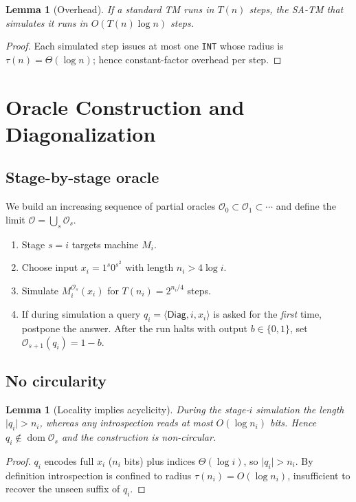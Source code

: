 \documentclass[12pt]{article}
\newcommand{\OO}{\mathcal{O}}
\newcommand{\Diag}{\mathsf{Diag}}
\DeclareMathOperator{\dom}{dom}            %
\theoremstyle{definition}
\theoremstyle{plain}
\newtheorem{lemma}[definition]{Lemma}
\theoremstyle{remark}
\begin{document}
\begin{lemma}[Overhead]\label{lem:overhead}
If a standard TM runs in \(T(n)\) steps, the SA-TM that simulates it
runs in \(O(T(n)\log n)\) steps.
\end{lemma}
\begin{proof}
Each simulated step issues at most one \texttt{INT}
whose radius is \(\tau(n)=\Theta(\log n)\);
hence constant-factor overhead per step.
\end{proof}

\section{Oracle Construction and Diagonalization}\label{sec:oracle}

\subsection{Stage-by-stage oracle}

We build an increasing sequence of partial oracles
\(\OO_0\subset\OO_1\subset\cdots\) and define the limit
\(\OO=\bigcup_s\OO_s\).

\begin{enumerate}
  \item Stage \(s=i\) targets machine \(M_i\).
  \item Choose input
        \(x_i = 1^s0^{s^2}\) with length \(n_i>4\log i\).
  \item Simulate \(M_i^{\OO_s}(x_i)\) for
        \(T(n_i)=2^{n_i/4}\) steps.
  \item If during simulation a query
        \(q_i=\langle\Diag,i,x_i\rangle\) is asked
        for the \emph{first} time, postpone the answer.
        After the run halts with output \(b\in\{0,1\}\),
        set \(\OO_{s+1}(q_i)=1-b\).
\end{enumerate}

\subsection{No circularity}

\begin{lemma}[Locality implies acyclicity]\label{lem:nocirc}
During the stage-\(i\) simulation the length \(\lvert q_i\rvert>n_i\),
whereas any introspection reads at most \(O(\log n_i)\) bits.
Hence \(q_i\notin\dom\OO_s\) and the construction is non-circular.
\end{lemma}
\begin{proof}
\(q_i\) encodes full \(x_i\) (\(n_i\) bits) plus indices \(\Theta(\log i)\),
so \(\lvert q_i\rvert>n_i\).
By definition introspection is confined to radius \(\tau(n_i)=O(\log n_i)\),
insufficient to recover the unseen suffix of \(q_i\).
\end{proof}
\end{document}
